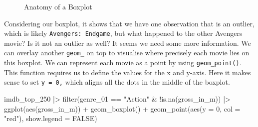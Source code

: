 \documentclass[
  letterpaper,
]{krantz}
\makeatletter
\newenvironment{Shaded}{\begin{snugshade}}{\end{snugshade}}
\newcommand{\AttributeTok}[1]{\textcolor[rgb]{0.40,0.45,0.13}{#1}}
\newcommand{\ConstantTok}[1]{\textcolor[rgb]{0.56,0.35,0.01}{#1}}
\newcommand{\DecValTok}[1]{\textcolor[rgb]{0.68,0.00,0.00}{#1}}
\newcommand{\FunctionTok}[1]{\textcolor[rgb]{0.28,0.35,0.67}{#1}}
\newcommand{\NormalTok}[1]{\textcolor[rgb]{0.00,0.23,0.31}{#1}}
\newcommand{\SpecialCharTok}[1]{\textcolor[rgb]{0.37,0.37,0.37}{#1}}
\newcommand{\StringTok}[1]{\textcolor[rgb]{0.13,0.47,0.30}{#1}}
\newenvironment{kframe}{%
\medskip{}
\setlength{\fboxsep}{.8em}
 \def\at@end@of@kframe{}%
 \ifinner\ifhmode%
  \def\at@end@of@kframe{\end{minipage}}%
  \begin{minipage}{\columnwidth}%
 \fi\fi%
 \def\FrameCommand##1{\hskip\@totalleftmargin \hskip-\fboxsep
 \colorbox{shadecolor}{##1}\hskip-\fboxsep
     \hskip-\linewidth \hskip-\@totalleftmargin \hskip\columnwidth}%
 \MakeFramed {\advance\hsize-\width
   \@totalleftmargin\z@ \linewidth\hsize
   \@setminipage}}%
 {\par\unskip\endMakeFramed%
 \at@end@of@kframe}
\renewenvironment{Shaded}{\begin{kframe}}{\end{kframe}}
\makeatother
\begin{document}
\begin{figure}


\caption{\label{fig-anatomy-of-a-boxplot}Anatomy of a Boxplot}

\end{figure}%

Considering our boxplot, it shows that we have one observation that is
an outlier, which is likely \texttt{Avengers:\ Endgame}, but what
happened to the other Avengers movie? Is it not an outlier as well? It
seems we need some more information. We can overlay another
\texttt{geom\_} on top to visualise where precisely each movie lies on
this boxplot. We can represent each movie as a point by using
\texttt{geom\_point()}. This function requires us to define the values
for the x and y-axis. Here it makes sense to set \texttt{y\ =\ 0,} which
aligns all the dots in the middle of the boxplot.

\begin{Shaded}
\begin{Highlighting}[]
\NormalTok{imdb\_top\_250 }\SpecialCharTok{|\textgreater{}}
  \FunctionTok{filter}\NormalTok{(genre\_01 }\SpecialCharTok{==} \StringTok{"Action"} \SpecialCharTok{\&} \SpecialCharTok{!}\FunctionTok{is.na}\NormalTok{(gross\_in\_m)) }\SpecialCharTok{|\textgreater{}}
  \FunctionTok{ggplot}\NormalTok{(}\FunctionTok{aes}\NormalTok{(gross\_in\_m)) }\SpecialCharTok{+}
  \FunctionTok{geom\_boxplot}\NormalTok{() }\SpecialCharTok{+}
  \FunctionTok{geom\_point}\NormalTok{(}\FunctionTok{aes}\NormalTok{(}\AttributeTok{y =} \DecValTok{0}\NormalTok{, }\AttributeTok{col =} \StringTok{"red"}\NormalTok{),}
             \AttributeTok{show.legend =} \ConstantTok{FALSE}\NormalTok{)}
\end{Highlighting}
\end{Shaded}
\end{document}
